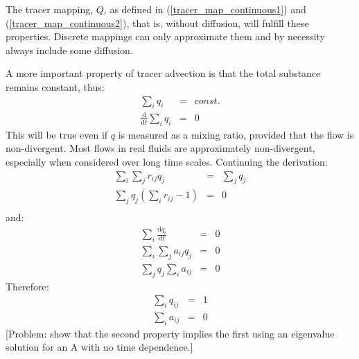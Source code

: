 \documentclass[12pt]{article}
\begin{document}
The tracer mapping, $Q$, as defined in 
(\ref{tracer_map_continuous1}) and (\ref{tracer_map_continuous2}),
that is, without diffusion, will fulfill these properties.  Discrete mappings
can only approximate them and by necessity always include some diffusion.

A more important property of tracer advection is that the total substance
remains constant, thus:
\begin{eqnarray}
\sum_i q_i & = & const. \\
\frac{\mathrm d}{\mathrm d t}\sum_i q_i & = & 0
\end{eqnarray}
This will be true even if $q$ is measured as a mixing ratio, provided that
the flow is non-divergent.  Most flows in real fluids are approximately 
non-divergent, especially when considered over long time scales.
Continuing the derivation:
\begin{eqnarray}
\sum_i \sum_j r_{ij} q_j & = & \sum_j q_j \\
\sum_j q_j \left ( \sum_i r_{ij} - 1 \right ) & = & 0 \\
\end{eqnarray}
and:
\begin{eqnarray}
\sum_i \frac{\mathrm d q_i}{\mathrm d t} & = & 0 \\
\sum_i \sum_j a_{ij} q_j & = & 0 \\
\sum_j q_j \sum_i a_{ij} & = & 0 
\end{eqnarray}
Therefore:
\begin{eqnarray}
\sum_i q_{ij} & = & 1 \\
\sum_i a_{ij} & = & 0
\end{eqnarray}
[Problem: show that the second property implies the first using an eigenvalue
solution for an A with no time dependence.]
\end{document}
